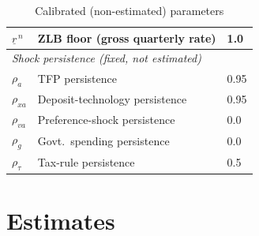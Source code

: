 \documentclass[]{article}
\begin{document}
\begin{table}[h]
\begin{tabular}{lll}
$\underline{r}^{\,n}$ & ZLB floor (gross quarterly rate) & 1.0 \\
\midrule
\multicolumn{3}{l}{\textit{Shock persistence (fixed, not estimated)}} \\
$\rho_a$     & TFP persistence                          & 0.95 \\
$\rho_{xa}$  & Deposit-technology persistence            & 0.95 \\
$\rho_{va}$  & Preference-shock persistence              & 0.0 \\
$\rho_g$     & Govt.\ spending persistence                & 0.0 \\
$\rho_\tau$  & Tax-rule persistence                     & 0.5 \\
\bottomrule
\end{tabular}
\caption{Calibrated (non-estimated) parameters}
\label{tab:calib}
\end{table}

\renewcommand{\arraystretch}{1.0}

\clearpage
\section{Estimates}  \label{app: est}
\end{document}
